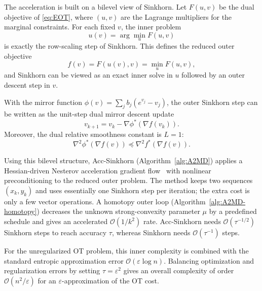\documentclass{article}
\theoremstyle{plain}
\theoremstyle{remark}
\begin{document}
The acceleration is built on a bilevel view of Sinkhorn. Let $F(u,v)$ be the dual objective of \eqref{eq:EOT}, where $(u,v)$ are the Lagrange multipliers for the marginal constraints. For each fixed $v$, the inner problem
$$
u(v)=\arg\min_u F(u,v)
$$
is exactly the row-scaling step of Sinkhorn. This defines the reduced outer objective
$$
f(v)=F(u(v),v)=\min_u F(u,v),
$$
and Sinkhorn can be viewed as an exact inner solve in $u$ followed by an outer descent step in $v$.

With the mirror function $\phi(v)=\sum_j b_j(e^{v_j}-v_j)$, the outer Sinkhorn step can be written as the unit-step dual mirror descent update
\begin{equation}
v_{k+1}=v_k-\nabla\phi^*(\nabla f(v_k)).
\end{equation}
Moreover, the dual relative smoothness constant is $L=1$:
$$
\nabla^2 \phi^*(\nabla f(v)) \preceq \nabla^2 f^*(\nabla f(v)).
$$

Using this bilevel structure, Acc-Sinkhorn (Algorithm~\ref{alg:A2MD}) applies a Hessian-driven Nesterov acceleration gradient flow~\citep{chen2019orderoptimizationmethodsbased} with nonlinear preconditioning to the reduced outer problem. The method keeps two sequences $(x_k,y_k)$ and uses essentially one Sinkhorn step per iteration; the extra cost is only a few vector operations. A homotopy outer loop (Algorithm~\ref{alg:A2MD-homotopy}) decreases the unknown strong-convexity parameter $\mu$ by a predefined schedule and gives an accelerated $\mathcal{O}(1/k^2)$ rate. Acc-Sinkhorn needs $\mathcal{O}(\tau^{-1/2})$ Sinkhorn steps to reach accuracy $\tau$, whereas Sinkhorn needs $\mathcal{O}(\tau^{-1})$ steps.

For the unregularized OT problem, this inner complexity is combined with the standard entropic approximation error $\mathcal O(\varepsilon\log n)$. Balancing optimization and regularization errors by setting $\tau=\varepsilon^2$ gives an overall complexity of order $\mathcal O(n^2/\varepsilon)$ for an $\varepsilon$-approximation of the OT cost.

%
%
\end{document}
